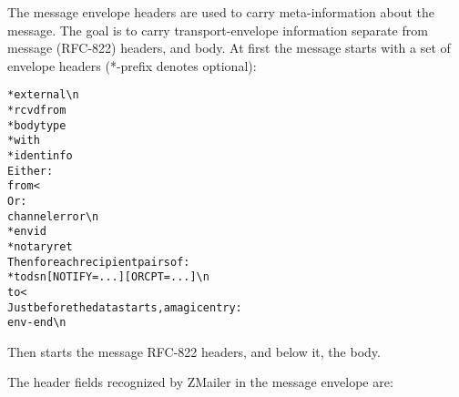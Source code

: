 The message envelope headers are used to carry meta-information
about the message.  The goal is to carry transport-envelope 
information separate from message (RFC-822) headers, and body.
At first the message starts with a set of envelope headers 
(*-prefix denotes optional):

\begin{alltt}
 *external \verb!\n!
 *rcvdfrom %s (%s) \verb!\n!
 *bodytype %s \verb!\n!
 *with %s \verb!\n!
 *identinfo %s \verb!\n!
{\rm{}Either:}
   from <%s> \verb!\n!
{\rm{}Or:}
   channel error \verb!\n!
 *envid %s \verb!\n!
 *notaryret %s \verb!\n!
{\rm{}Then for each recipient pairs of:}
 *todsn [NOTIFY=...] [ORCPT=...] \verb!\n!
 to <%s> \verb!\n!
{\rm{}Just before the data starts, a magic entry:}
 env-end \verb!\n!
\end{alltt}
Then starts the message RFC-822 headers, and below it, the body.



The header fields recognized by ZMailer in the message envelope are:

